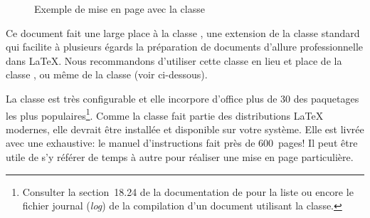 \begin{figure}
\begin{minipage}{0.48\linewidth}
  \end{minipage}
  \caption{Exemple de mise en page avec la classe }
  \label{fig:organisation:classes:book}
\end{figure}

Ce document fait une large place à la classe 
\citep{memoir}, une extension de la classe standard  qui
facilite à plusieurs égards la préparation de documents d'allure
professionnelle dans {\LaTeX}. Nous recommandons d'utiliser cette
classe en lieu et place de la classe , ou même de la
classe  (voir ci-dessous).

La classe  est très configurable et elle incorpore
d'office plus de 30 des paquetages les plus populaires\footnote{%
  Consulter la section~18.24 de la documentation de 
  pour la liste ou encore le fichier journal (\emph{log}) de la
  compilation d'un document utilisant la classe.}. %
Comme la classe fait partie des distributions {\LaTeX} modernes, elle
devrait être installée et disponible sur votre système. Elle est
livrée avec une %
exhaustive: le manuel d'instructions fait près de 600~pages! Il peut
être utile de s'y référer de temps à autre pour réaliser une mise en
page particulière.

